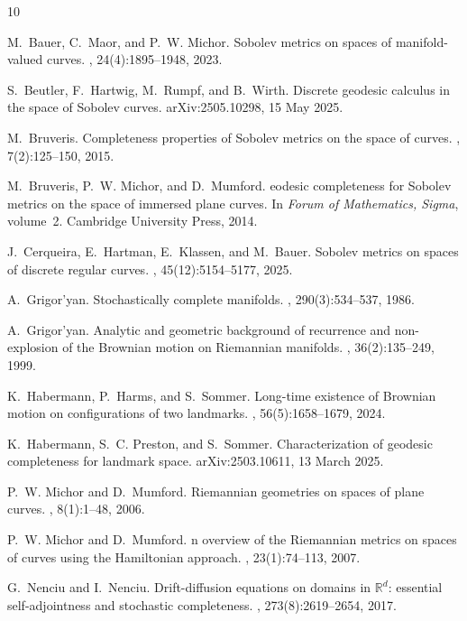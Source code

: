 \documentclass[11pt]{article}
\begin{document}

\begin{thebibliography}{10}

M.~Bauer, C.~Maor, and P.~W. Michor.
\newblock Sobolev metrics on spaces of manifold-valued curves.
, 24(4):1895--1948, 2023.

S.~Beutler, F.~Hartwig, M.~Rumpf, and B.~Wirth.
\newblock Discrete geodesic calculus in the space of {S}obolev curves.
\newblock arXiv:2505.10298, 15 May 2025.

M.~Bruveris.
\newblock Completeness properties of {S}obolev metrics on the space of curves.
, 7(2):125–150, 2015.

M.~Bruveris, P.~W. Michor, and D.~Mumford.
eodesic completeness for {S}obolev metrics on the space of immersed plane curves.
\newblock In {\em Forum of Mathematics, Sigma}, volume~2. Cambridge University Press, 2014.

J.~Cerqueira, E.~Hartman, E.~Klassen, and M.~Bauer.
\newblock Sobolev metrics on spaces of discrete regular curves.
, 45(12):5154--5177, 2025.

A.~Grigor'yan.
\newblock Stochastically complete manifolds.
, 290(3):534--537, 1986.

A.~Grigor'yan.
\newblock Analytic and geometric background of recurrence and non-explosion of the {B}rownian motion on {R}iemannian manifolds.
, 36(2):135--249, 1999.

K.~Habermann, P.~Harms, and S.~Sommer.
\newblock Long-time existence of {B}rownian motion on configurations of two landmarks.
, 56(5):1658–1679, 2024.

K.~Habermann, S.~C. Preston, and S.~Sommer.
\newblock Characterization of geodesic completeness for landmark space.
\newblock arXiv:2503.10611, 13 March 2025.

P.~W. Michor and D.~Mumford.
\newblock Riemannian geometries on spaces of plane curves.
, 8(1):1--48, 2006.

P.~W. Michor and D.~Mumford.
n overview of the {R}iemannian metrics on spaces of curves using the {H}amiltonian approach.
, 23(1):74–113, 2007.

G.~Nenciu and I.~Nenciu.
\newblock Drift-diffusion equations on domains in {$\mathbb{R}^d$}: essential self-adjointness and stochastic completeness.
, 273(8):2619--2654, 2017.

\end{thebibliography}
\end{document}
